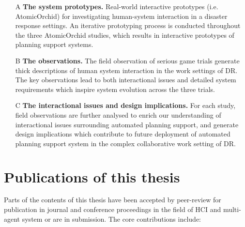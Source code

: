 \begin{enumerate}
  \item[A] \textbf{The system prototypes.} Real-world interactive prototypes (i.e. AtomicOrchid) for investigating human-system interaction in a disaster response settings. An iterative prototyping process is conducted throughout the three AtomicOrchid studies, which results in interactive prototypes of planning support systems. 
  
  \item[B] \textbf{The observations.} The field observation of serious game trials generate thick descriptions of human system interaction in the work settings of \ac{DR}. The key observations lead to both interactional issues and detailed system requirements which inspire system evolution across the three trials.
  
  \item[C] \textbf{The interactional issues and design implications.} For each study, field observations are further analysed to enrich our understanding of interactional issues surrounding automated planning support, and generate design implications which contribute to future deployment of automated planning support system in the complex collaborative work setting of \ac{DR}. 
\end{enumerate}


\section{Publications of this thesis} 
Parts of the contents of this thesis have been accepted by peer-review for publication in journal and conference proceedings in the field of \ac{HCI} and multi-agent system or are in submission. The core contributions include: \\


